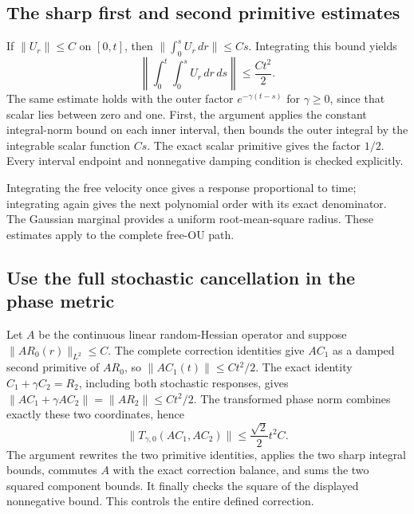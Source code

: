 \documentclass[11pt,a4paper]{report}
\begin{document}
\subsection{\texorpdfstring{The sharp first and second primitive estimates}{The sharp first and second primitive estimates}}
\label{report-step-KineticLangevin-FreeOUCorrectionBound-lean-1}


If \(\|U_r\|\le C\) on \([0,t]\), then \(\|\int_0^sU_r\,dr\|\le Cs\). Integrating this bound yields \[\left\|\int_0^t\int_0^sU_r\,dr\,ds\right\|\le\frac{Ct^2}{2}.\] The same estimate holds with the outer factor \(e^{-\gamma(t-s)}\) for \(\gamma\ge0\), since that scalar lies between zero and one. First, the argument applies the constant integral-norm bound on each inner interval, then bounds the outer integral by the integrable scalar function \(Cs\). The exact scalar primitive gives the factor \(1/2\). Every interval endpoint and nonnegative damping condition is checked explicitly.



Integrating the free velocity once gives a response proportional to time; integrating again gives the next polynomial order with its exact denominator. The Gaussian marginal provides a uniform root-mean-square radius. These estimates apply to the complete free-OU path.

\subsection{\texorpdfstring{Use the full stochastic cancellation in the phase metric}{Use the full stochastic cancellation in the phase metric}}
\label{report-step-KineticLangevin-FreeOUCorrectionBound-lean-2}


Let \(A\) be the continuous linear random-Hessian operator and suppose \(\|AR_0(r)\|_{L^2}\le C\). The complete correction identities give \(AC_1\) as a damped second primitive of \(AR_0\), so \(\|AC_1(t)\|\le Ct^2/2\). The exact identity \(C_1+\gamma C_2=R_2\), including both stochastic responses, gives \(\|AC_1+\gamma AC_2\|=\|AR_2\|\le Ct^2/2\). The transformed phase norm combines exactly these two coordinates, hence \[\|T_{\gamma,0}(AC_1,AC_2)\|\le\frac{\sqrt2}{2}t^2C.\] The argument rewrites the two primitive identities, applies the two sharp integral bounds, commutes \(A\) with the exact correction balance, and sums the two squared component bounds. It finally checks the square of the displayed nonnegative bound. This controls the entire defined correction.
\end{document}
